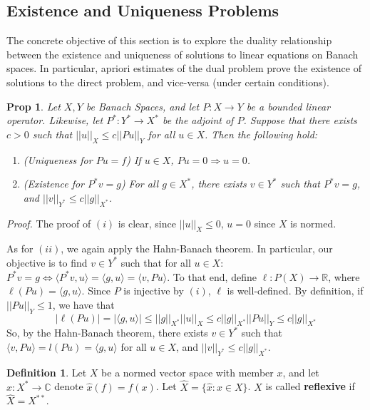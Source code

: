 \documentclass[letterpaper,10pt]{article}
\theoremstyle{definition}
\newtheorem{dfn}{Definition}
\theoremstyle{remark}
\theoremstyle{plain}
\newtheorem{prop}[thm]{Prop}
\renewenvironment{proof}{
    \vspace{5pt}
    \begin{mdframed}[bottomline=false,topline=false,rightline=false, skipabove=0]
    \noindent\textit{Proof.}}
{
    \hspace{\fill}\qedsymbol
    \end{mdframed}
}
\begin{document}
\subsection{Existence and Uniqueness Problems}
The concrete objective of this section is to explore the duality relationship 
between the existence and uniqueness of solutions to linear equations
on Banach spaces. In particular, apriori estimates of the dual
problem prove the existence of solutions to the direct problem, and vice-versa (under
certain conditions).
\begin{prop}\label{prop:dual1}
    Let $X,Y$ be Banach Spaces, and let $P:X\rightarrow Y$ be a bounded linear
    operator. Likewise, let $P^*:Y^*\rightarrow X^*$ be the adjoint of $P$.
    Suppose that there exists $c>0$ such that $||u||_X\leq c||Pu||_Y$ for all $u\in X$.
    Then the following hold:
    \begin{enumerate}[label=\roman*.]
        \item (Uniqueness for $Pu=f$) If $u\in X$, $Pu=0\Rightarrow u=0$.
        \item (Existence for $P^*v=g$) For all $g\in X^*$, there exists 
            $v\in Y^*$ such that $P^*v=g$, and $||v||_{Y^*}\leq c||g||_{X^*}$.
    \end{enumerate}
\end{prop}
\begin{proof}
    The proof of $(i)$ is clear, since $||u||_{X}\leq 0$, $u=0$ since $X$ is normed.

    As for $(ii)$, we again apply the Hahn-Banach theorem. In particular, our objective
    is to find $v\in Y^*$ such that for all $u\in X$:
    $P^*v=g\Leftrightarrow\langle P^*v,u\rangle=\langle g,u\rangle=\langle v, Pu\rangle$.
    To that end, define $\ell:P(X)\rightarrow\mathbb R$, where $\ell(Pu)=\langle g,u\rangle$.
    Since $P$ is injective by $(i)$, $\ell$ is well-defined.
    By definition, if $||Pu||_Y\leq 1$, we have that 
    $$
    |\ell(Pu)|=|\langle g,u\rangle|\leq||g||_{X^*}||u||_X
    \leq c||g||_{X^*}||Pu||_Y
    \leq c||g||_{X^*}
    $$
    So, by the Hahn-Banach theorem, there exists $v\in Y^*$ such that 
    $\langle v,Pu\rangle=l(Pu)=\langle g,u\rangle$ for all $u\in X$, 
    and $||v||_{Y^*}\leq c||g||_{X^*}$.
\end{proof}
\begin{dfn}
    Let $X$ be a normed vector space with member $x$, 
    and let $\hat x:X^*\rightarrow\mathbb C$ denote
    $\hat x(f)=f(x)$. Let $\hat X=\{\hat x:x\in X\}$.
    $X$ is called \textbf{reflexive} if $\hat X=X^{**}$. 
\end{dfn}
\end{document}

